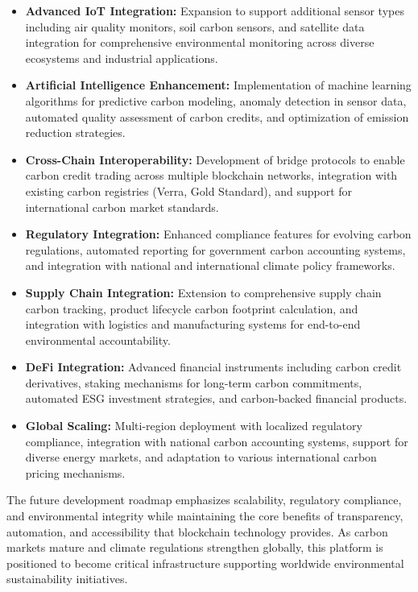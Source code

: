 \documentclass[oneside,a4paper,12pt]{book}
\begin{document}
\begin{itemize}
\item \textbf{Advanced IoT Integration:} Expansion to support additional sensor types including air quality monitors, soil carbon sensors, and satellite data integration for comprehensive environmental monitoring across diverse ecosystems and industrial applications.

\item \textbf{Artificial Intelligence Enhancement:} Implementation of machine learning algorithms for predictive carbon modeling, anomaly detection in sensor data, automated quality assessment of carbon credits, and optimization of emission reduction strategies.

\item \textbf{Cross-Chain Interoperability:} Development of bridge protocols to enable carbon credit trading across multiple blockchain networks, integration with existing carbon registries (Verra, Gold Standard), and support for international carbon market standards.

\item \textbf{Regulatory Integration:} Enhanced compliance features for evolving carbon regulations, automated reporting for government carbon accounting systems, and integration with national and international climate policy frameworks.

\item \textbf{Supply Chain Integration:} Extension to comprehensive supply chain carbon tracking, product lifecycle carbon footprint calculation, and integration with logistics and manufacturing systems for end-to-end environmental accountability.

\item \textbf{DeFi Integration:} Advanced financial instruments including carbon credit derivatives, staking mechanisms for long-term carbon commitments, automated ESG investment strategies, and carbon-backed financial products.

\item \textbf{Global Scaling:} Multi-region deployment with localized regulatory compliance, integration with national carbon accounting systems, support for diverse energy markets, and adaptation to various international carbon pricing mechanisms.
\end{itemize}

The future development roadmap emphasizes scalability, regulatory compliance, and environmental integrity while maintaining the core benefits of transparency, automation, and accessibility that blockchain technology provides. As carbon markets mature and climate regulations strengthen globally, this platform is positioned to become critical infrastructure supporting worldwide environmental sustainability initiatives.
\end{document}
